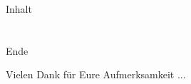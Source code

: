\documentclass[12pt,hyperref={pdfpagelabels=false},notes=show]{beamer}
\begin{document}

\begin{frame}{Inhalt}
    \hspace{0.1\textwidth}
    \parbox[c][0.8\textheight][s]{0.8\textwidth}{
        \tableofcontents
    }
\end{frame}










\section*{}
\begin{frame}{Ende}
    \begin{center}
        Vielen Dank für Eure Aufmerksamkeit	...
     \end{center}
\end{frame}\addtocounter{framenumber}{-1}
	
\section*{}


\end{document}
